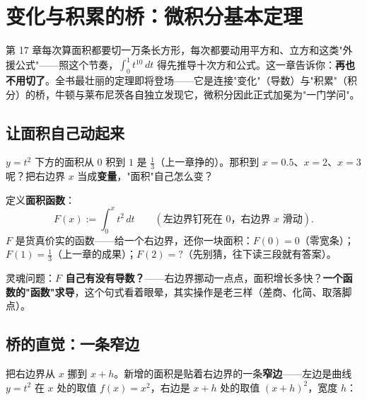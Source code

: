 \chapter{变化与积累的桥：微积分基本定理}

第 17 章每次算面积都要切一万条长方形，每次都要动用平方和、立方和这类"外援公式"——照这个节奏，$\int_0^1 t^{10}\,dt$ 得先推导十次方和公式。这一章告诉你：\textbf{再也不用切了}。全书最壮丽的定理即将登场——它是连接"变化"（导数）与"积累"（积分）的桥，牛顿与莱布尼茨各自独立发现它，微积分因此正式加冕为"一门学问"。

\section{让面积自己动起来}

\begin{kaiwei}
$y = t^2$ 下方的面积从 $0$ 积到 $1$ 是 $\tfrac13$（上一章挣的）。那积到 $x = 0.5$、$x = 2$、$x = 3$ 呢？把右边界 $x$ 当成\textbf{变量}，"面积"自己怎么变？
\end{kaiwei}

定义\textbf{面积函数}：
\[
F(x) := \int_0^x t^2\,dt \qquad (\text{左边界钉死在 } 0\text{，右边界 } x\text{ 滑动}) .
\]
$F$ 是货真价实的函数——给一个右边界，还你一块面积：$F(0) = 0$（零宽条）；$F(1) = \tfrac13$（上一章的成果）；$F(2) = ?$（先别猜，往下读三段就有答案）。

灵魂问题：\textbf{$F$ 自己有没有导数？}——右边界挪动一点点，面积增长多快？\textbf{一个函数的"函数"求导}，这个句式看着眼晕，其实操作是老三样（差商、化简、取落脚点）。

\section{桥的直觉：一条窄边}

把右边界从 $x$ 挪到 $x + h$。新增的面积是贴着右边界的一条\textbf{窄边}——左边是曲线 $y = t^2$ 在 $x$ 处的取值 $f(x) = x^2$，右边是 $x+h$ 处的取值 $(x+h)^2$，宽度 $h$：


